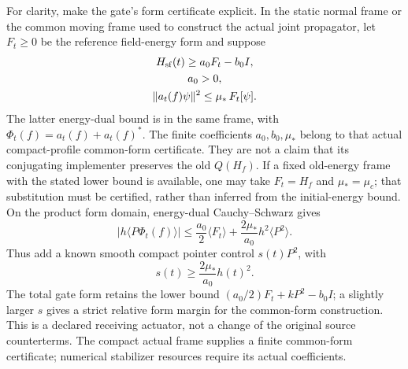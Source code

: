 For clarity, make the gate's form certificate explicit. In the static
normal frame or the common moving frame used to construct the actual
joint propagator, let $F_t\geq0$ be the reference field-energy form and
suppose
\begin{equation}
\begin{gathered}
H_{\rm sf}(t)\geq a_0F_t-b_0I,\\
 a_0>0,
 \\
 \|a_t(f)\psi\|^2\leq\mu_*\,F_t[\psi].
\end{gathered}
\label{eq:chvidr-gate-form-certificate}
\end{equation}
The latter energy-dual bound is in the same frame, with
$\Phi_t(f)=a_t(f)+a_t(f)^*$. The finite coefficients $a_0,b_0,\mu_*$
belong to that actual compact-profile common-form certificate. They are
not a claim that its conjugating implementer preserves the old
$Q(H_f)$. If a fixed old-energy frame with the stated lower bound is
available, one may take $F_t=H_f$ and $\mu_*=\mu_c$; that substitution
must be certified, rather than inferred from the initial-energy bound.
On the product form domain, energy-dual Cauchy--Schwarz gives
\begin{equation}
 |h\langle P\Phi_t(f)\rangle|
 \leq\frac{a_0}{2}\langle F_t\rangle
       +\frac{2\mu_*}{a_0}h^2\langle P^2\rangle.
 \label{eq:chvidr-gate-young-bound}
\end{equation}
Thus add a known smooth compact pointer control $s(t)P^2$, with
\begin{equation}
 s(t)\geq\frac{2\mu_*}{a_0}h(t)^2.
 \label{eq:chvidr-pointer-stabilizer}
\end{equation}
The total gate form retains the lower bound
$(a_0/2)F_t+kP^2-b_0I$; a slightly larger $s$ gives a strict relative
form margin for the common-form construction. This is a declared
receiving actuator, not a change of the original source counterterms.
The compact actual frame supplies a finite common-form certificate;
numerical stabilizer resources require its actual coefficients.

